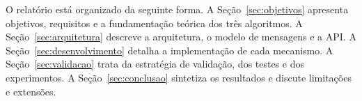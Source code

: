 O relatório está organizado da seguinte forma. A Seção~\ref{sec:objetivos} apresenta objetivos, requisitos e a fundamentação teórica dos três algoritmos. A Seção~\ref{sec:arquitetura} descreve a arquitetura, o modelo de mensagens e a API. A Seção~\ref{sec:desenvolvimento} detalha a implementação de cada mecanismo. A Seção~\ref{sec:validacao} trata da estratégia de validação, dos testes e dos experimentos. A Seção~\ref{sec:conclusao} sintetiza os resultados e discute limitações e extensões.
